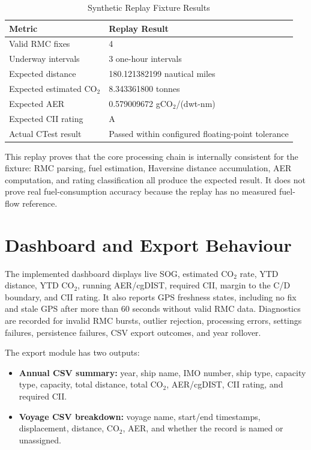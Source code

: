 \begin{table}[H]
    \centering
    \caption{Synthetic Replay Fixture Results}
    \label{tab:replay-results}
    \begin{tabularx}{0.86\textwidth}{lX}
        \toprule
        \textbf{Metric} & \textbf{Replay Result} \\
        \midrule
        Valid RMC fixes & 4 \\
        Underway intervals & 3 one-hour intervals \\
        Expected distance & 180.121382199 nautical miles \\
        Expected estimated CO$_2$ & 8.343361800 tonnes \\
        Expected AER & 0.579009672 gCO$_2$/(dwt-nm) \\
        Expected CII rating & A \\
        Actual CTest result & Passed within configured floating-point tolerance \\
        \bottomrule
    \end{tabularx}
\end{table}

This replay proves that the core processing chain is internally consistent for the fixture: RMC parsing, fuel estimation, Haversine distance accumulation, AER computation, and rating classification all produce the expected result. It does not prove real fuel-consumption accuracy because the replay has no measured fuel-flow reference.

\section{Dashboard and Export Behaviour}
The implemented dashboard displays live SOG, estimated CO$_2$ rate, YTD distance, YTD CO$_2$, running AER/cgDIST, required CII, margin to the C/D boundary, and CII rating. It also reports GPS freshness states, including no fix and stale GPS after more than 60 seconds without valid RMC data. Diagnostics are recorded for invalid RMC bursts, outlier rejection, processing errors, settings failures, persistence failures, CSV export outcomes, and year rollover.

The export module has two outputs:
\begin{itemize}
    \item \textbf{Annual CSV summary:} year, ship name, IMO number, ship type, capacity type, capacity, total distance, total CO$_2$, AER/cgDIST, CII rating, and required CII.
    \item \textbf{Voyage CSV breakdown:} voyage name, start/end timestamps, displacement, distance, CO$_2$, AER, and whether the record is named or unassigned.
\end{itemize}

